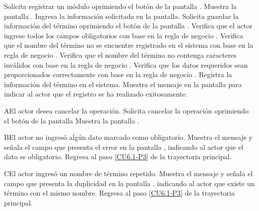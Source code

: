 	\begin{UCtrayectoria}
		\UCpaso[\UCactor] Solicita registrar un módulo oprimiendo el botón  de la pantalla .
		\UCpaso[\UCsist] Muestra la pantalla .
		\UCpaso[\UCactor] Ingresa la información solicitada en la pantalla. \label{CU6.1-P3}
		\UCpaso[\UCactor] Solicita guardar la información del término oprimiendo el botón  de la pantalla . 
		\UCpaso[\UCsist] Verifica que el actor ingrese todos los campos obligatorios con base en la regla de negocio . 
		\UCpaso[\UCsist] Verifica que el nombre del término no se encuentre registrado en el sistema con base en la regla de negocio . 
		\UCpaso[\UCsist] Verifica que el nombre del término no contenga caracteres inválidos con base en la regla de negocio . 
		\UCpaso[\UCsist] Verifica que los datos requeridos sean proporcionados correctamente con base en la regla de negocio .  
		\UCpaso[\UCsist] Registra la información del término en el sistema.
		\UCpaso[\UCsist] Muestra el mensaje  en la pantalla  para indicar al actor que el registro se ha realizado exitosamente.
	\end{UCtrayectoria}		
	
	\begin{UCtrayectoriaA}{A}{El actor desea cancelar la operación.}
		\UCpaso[\UCactor] Solicita cancelar la operación oprimiendo el botón  de la pantalla 
		\UCpaso[\UCsist] Muestra la pantalla .
	\end{UCtrayectoriaA}

	\begin{UCtrayectoriaA}{B}{El actor no ingresó algún dato marcado como obligatorio.}
		\UCpaso[\UCsist] Muestra el mensaje  y señala el campo que presenta el error en la pantalla , indicando al actor que el dato es obligatorio.
		\UCpaso Regresa al paso \ref{CU6.1-P3} de la trayectoria principal.
	\end{UCtrayectoriaA}
	
	\begin{UCtrayectoriaA}{C}{El actor ingresó un nombre de término repetido.}
		\UCpaso[\UCsist] Muestra el mensaje  y señala el campo que presenta la duplicidad en la pantalla , indicando al actor que existe un término con el mismo nombre.
		\UCpaso Regresa al paso \ref{CU6.1-P3} de la trayectoria principal.
	\end{UCtrayectoriaA}

